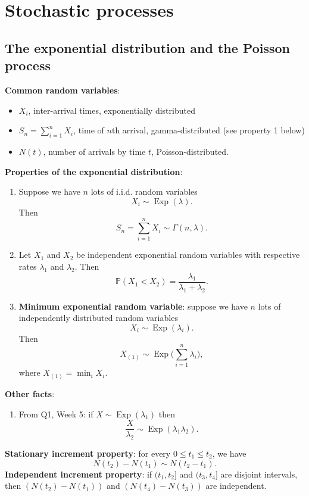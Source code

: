 \restoregeometry

\chapter{Stochastic processes}

\section{The exponential distribution and the Poisson process}

\textbf{Common random variables}:
\begin{itemize}
    \item $X_i$, inter-arrival times, exponentially distributed
    \item $S_n = \sum_{i = 1}^n X_i$, time of $n$th arrival, gamma-distributed (see property 1 below)
    \item $N(t)$, number of arrivals by time $t$, Poisson-distributed.
\end{itemize}

\textbf{Properties of the exponential distribution}:
    \begin{enumerate}
        \item Suppose we have $n$ lots of i.i.d. random variables
            $$ X_i \sim \operatorname{Exp}(\lambda) . $$
        Then
            $$ S_n = \sum_{i = 1}^n X_i \sim \Gamma(n, \lambda) . $$
        \item Let $X_1$ and $X_2$ be independent exponential random variables with respective rates $\lambda_1$ and $\lambda_2$. Then
            $$ \mathbb{P}(X_1 < X_2) = \frac{\lambda_1}{\lambda_1 + \lambda_2} . $$
        \item \textbf{Minimum exponential random variable}: suppose we have $n$ lots of independently distributed random variables
            $$ X_i \sim \operatorname{Exp}(\lambda_i) . $$
        Then
            $$ X_{(1)} \sim \operatorname{Exp}\biggl( \sum_{i = 1}^n \lambda_i \biggr) , $$
        where $X_{(1)} = \min_i X_i$.
    \end{enumerate}

\textbf{Other facts}:
    \begin{enumerate}
        \item From Q1, Week 5: if $X \sim \operatorname{Exp}(\lambda_1)$ then
            $$ \frac{X}{\lambda_2} \sim \operatorname{Exp}(\lambda_1 \lambda_2) . $$
    \end{enumerate}
    
\textbf{Stationary increment property}: for every $0 \leq t_1 \leq t_2$, we have
    $$ N(t_2) - N(t_1) \sim N(t_2 - t_1) . $$
\textbf{Independent increment property}: if $(t_1, t_2]$ and $(t_3, t_4]$ are disjoint intervals, then $(N(t_2) - N(t_1))$ and $(N(t_4) - N(t_3))$ are independent.

